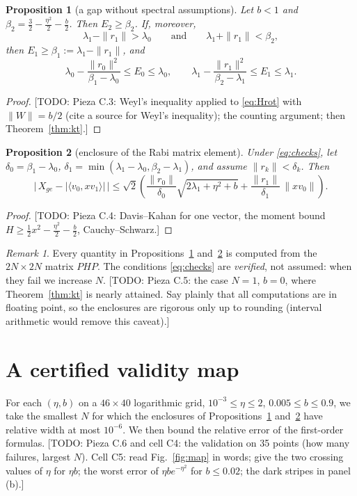 \documentclass[11pt]{article}
\newtheorem{proposition}{Proposition}
\theoremstyle{remark}
\newtheorem{remark}{Remark}
\newcommand{\todo}[1]{\textcolor{red!70!black}{[TODO: #1]}}
\newcommand{\xge}{X_{ge}}
\begin{document}
\begin{proposition}[a gap without spectral assumptions]\label{prop:gap}
Let $b<1$ and $\beta_2=\tfrac32-\tfrac{\eta^2}2-\tfrac b2$. Then $E_2\ge\beta_2$. If, moreover,
\begin{equation}\label{eq:checks}
\lambda_1-\|r_1\|>\lambda_0\qquad\text{and}\qquad\lambda_1+\|r_1\|<\beta_2,
\end{equation}
then $E_1\ge\beta_1:=\lambda_1-\|r_1\|$, and
\[
\lambda_0-\frac{\|r_0\|^2}{\beta_1-\lambda_0}\le E_0\le\lambda_0,\qquad
\lambda_1-\frac{\|r_1\|^2}{\beta_2-\lambda_1}\le E_1\le\lambda_1 .
\]
\end{proposition}
\begin{proof}\todo{Pieza C.3: Weyl's inequality applied to \eqref{eq:Hrot} with $\|W\|=b/2$ (cite a source for Weyl's inequality); the counting argument; then Theorem~\ref{thm:kt}.}\end{proof}

\begin{proposition}[enclosure of the Rabi matrix element]\label{prop:x}
Under \eqref{eq:checks}, let $\delta_0=\beta_1-\lambda_0$, $\delta_1=\min(\lambda_1-\lambda_0,\beta_2-\lambda_1)$, and assume $\|r_k\|<\delta_k$. Then
\[
\bigl|\,\xge-|\langle v_0,xv_1\rangle|\,\bigr|\le\sqrt2\left(\frac{\|r_0\|}{\delta_0}\sqrt{2\lambda_1+\eta^2+b}+\frac{\|r_1\|}{\delta_1}\,\|xv_0\|\right).
\]
\end{proposition}
\begin{proof}\todo{Pieza C.4: Davis--Kahan for one vector, the moment bound $H\ge\tfrac12x^2-\tfrac{\eta^2}2-\tfrac b2$, Cauchy--Schwarz.}\end{proof}

\begin{remark}
Every quantity in Propositions~\ref{prop:gap} and~\ref{prop:x} is computed from the $2N\times2N$ matrix $PHP$. The conditions \eqref{eq:checks} are \emph{verified}, not assumed: when they fail we increase $N$. \todo{Pieza C.5: the case $N=1$, $b=0$, where Theorem~\ref{thm:kt} is nearly attained. Say plainly that all computations are in floating point, so the enclosures are rigorous only up to rounding (interval arithmetic would remove this caveat).}
\end{remark}

\section{A certified validity map}\label{sec:map}
For each $(\eta,b)$ on a $46\times40$ logarithmic grid, $10^{-3}\le\eta\le2$, $0.005\le b\le0.9$, we take the smallest $N$ for which the enclosures of Propositions~\ref{prop:gap} and~\ref{prop:x} have relative width at most $10^{-6}$. We then bound the relative error of the first-order formulas.
\todo{Pieza C.6 and cell C4: the validation on 35 points (how many failures, largest $N$). Cell C5: read Fig.~\ref{fig:map} in words; give the two crossing values of $\eta$ for $\eta b$; the worst error of $\eta b e^{-\eta^2}$ for $b\le0.02$; the dark stripes in panel (b).}
\end{document}
